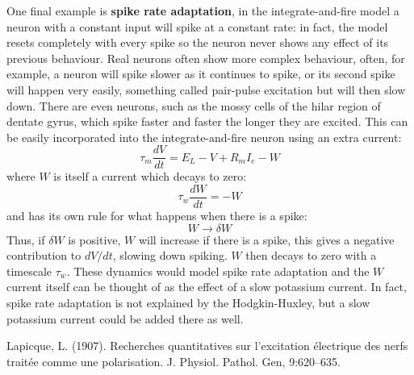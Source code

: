 \documentclass{article}
\begin{document}
One final example is \textbf{spike rate adaptation}, in the
integrate-and-fire model a neuron with a constant input will spike at
a constant rate: in fact, the model resets completely with every spike
so the neuron never shows any effect of its previous behaviour. Real
neurons often show more complex behaviour, often, for example, a
neuron will spike slower as it continues to spike, or its second spike
will happen very easily, something called pair-pulse excitation but
will then slow down. There are even neurons, such as the mossy cells
of the hilar region of dentate gyrus, which spike faster and faster
the longer they are excited. This can be easily incorporated into the
integrate-and-fire neuron using an extra current:
\begin{equation}
\tau_m\frac{dV}{dt}=E_L-V+R_mI_e-W
\end{equation}  
where $W$ is itself a current which decays to zero:
\begin{equation}
\tau_w\frac{dW}{dt}=-W
\end{equation}  
and has its own rule for what happens when there is a spike:
\begin{equation}
  W\rightarrow \delta W
\end{equation}
Thus, if $\delta W$ is positive, $W$ will increase if there is a
spike, this gives a negative contribution to $dV/dt$, slowing down
spiking. $W$ then decays to zero with a timescale $\tau_w$. These
dynamics would model spike rate adaptation and the $W$ current itself
can be thought of as the effect of a slow potassium current. In fact,
spike rate adaptation is not explained by the Hodgkin-Huxley, but a
slow potassium current could be added there as well.









\begin{thebibliography}{99}
Lapicque, L. (1907). 
\newblock Recherches quantitatives sur l'excitation \'{e}lectrique des nerfs trait\'{e}e comme une polarisation. 
\newblock J. Physiol. Pathol. Gen, 9:620--635.
\end{thebibliography}
\end{document}
